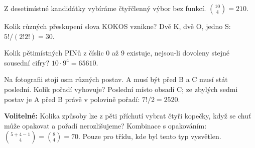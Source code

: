 \documentclass[11pt,a4paper]{article}
\begin{document}
\begin{zadaniReseniBox}[title={Samostatná práce 1}]
Z desetimístné kandidátky vybíráme čtyřčlenný výbor bez funkcí.
\tcblower
$\binom{10}{4}=210$.
\end{zadaniReseniBox}



\begin{zadaniReseniBox}[title={Samostatná práce 2}]
Kolik různých přeskupení slova KOKOS vznikne?
\tcblower
Dvě K, dvě O, jedno S: $5!/(2!2!)=30$.
\end{zadaniReseniBox}



\begin{zadaniReseniBox}[title={Samostatná práce 3}]
Kolik pětimístných PINů z číslic 0 až 9 existuje, nejsou-li dovoleny stejné sousední cifry?
\tcblower
$10\cdot9^4=65610$.
\end{zadaniReseniBox}




\begin{zadaniReseniBox}[title={Rozšíření 1}]
Na fotografii stojí osm různých postav. A musí být před B a C musí stát poslední. Kolik pořadí vyhovuje?
\tcblower
Poslední místo obsadí C; ze zbylých sedmi postav je A před B právě v polovině pořadí: $7!/2=2520$.
\end{zadaniReseniBox}



\begin{zadaniReseniBox}[title={Rozšíření 2}]
\textbf{Volitelné:} Kolika způsoby lze z pěti příchutí vybrat čtyři kopečky, když se chuť může opakovat a pořadí nerozlišujeme?
\tcblower
Kombinace s opakováním: $\binom{5+4-1}{4}=\binom84=70$. Pouze pro třídu, kde byl tento typ vysvětlen.
\end{zadaniReseniBox}




\end{document}
